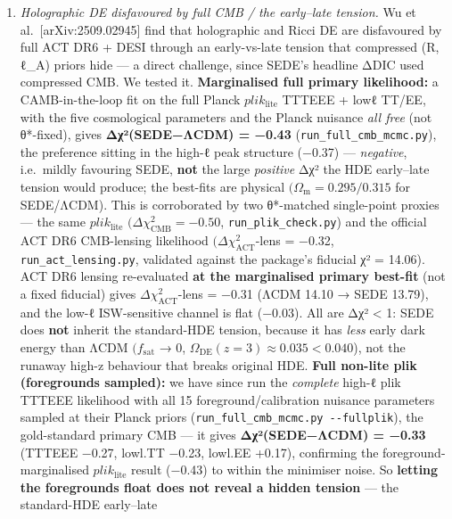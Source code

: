 \documentclass[
  10pt,
]{article}
\providecommand{\tightlist}{%
  \setlength{\itemsep}{0pt}\setlength{\parskip}{0pt}}
\begin{document}
\begin{enumerate}
\def\labelenumi{\arabic{enumi}.}
\tightlist
\item
  \emph{Holographic DE disfavoured by full CMB / the early--late
  tension.} Wu et al.~{[}arXiv:2509.02945{]} find that holographic and
  Ricci DE are disfavoured by full ACT DR6 + DESI through an
  early-vs-late tension that compressed (R, ℓ\_A) priors hide --- a
  direct challenge, since SEDE's headline ΔDIC used compressed CMB. We
  tested it. \textbf{Marginalised full primary likelihood:} a
  CAMB-in-the-loop fit on the full Planck \(plik_{\mathrm{lite}}\)
  TTTEEE + lowℓ TT/EE, with the five cosmological parameters and the
  Planck nuisance \emph{all free} (not θ*-fixed), gives
  \textbf{Δχ²(SEDE−ΛCDM) = −0.43} (\texttt{run\_full\_cmb\_mcmc.py}),
  the preference sitting in the high-ℓ peak structure (−0.37) ---
  \emph{negative}, i.e.~mildly favouring SEDE, \textbf{not} the large
  \emph{positive} Δχ² the HDE early--late tension would produce; the
  best-fits are physical \((\Omega _{\mathrm{m}} = 0.295/0.315\) for
  SEDE/ΛCDM). This is corroborated by two θ*-matched single-point
  proxies --- the same \(plik_{\mathrm{lite}}\)
  \((\Delta \chi ^{2}_{\mathrm{CMB}} = -0.50\),
  \texttt{run\_plik\_check.py}) and the official ACT DR6 CMB-lensing
  likelihood \((\Delta \chi ^{2}_{\mathrm{ACT}}\)-lens = −0.32,
  \texttt{run\_act\_lensing.py}, validated against the package's
  fiducial χ² = 14.06). ACT DR6 lensing re-evaluated \textbf{at the
  marginalised primary best-fit} (not a fixed fiducial) gives
  \(\Delta \chi ^{2}_{\mathrm{ACT}}\)-lens = −0.31 (ΛCDM 14.10 → SEDE
  13.79), and the low-ℓ ISW-sensitive channel is flat (−0.03). All are
  \textbar Δχ²\textbar{} \textless{} 1: SEDE does \textbf{not} inherit
  the standard-HDE tension, because it has \emph{less} early dark energy
  than ΛCDM \((f_{\mathrm{sat}}\) → 0,
  \(\Omega _{\mathrm{DE}}(z=3) \approx  0.035 < 0.040\)), not the
  runaway high-z behaviour that breaks original HDE. \textbf{Full
  non-lite plik (foregrounds sampled):} we have since run the
  \emph{complete} high-ℓ plik TTTEEE likelihood with all 15
  foreground/calibration nuisance parameters sampled at their Planck
  priors (\texttt{run\_full\_cmb\_mcmc.py\ -\/-fullplik}), the
  gold-standard primary CMB --- it gives \textbf{Δχ²(SEDE−ΛCDM) = −0.33}
  (TTTEEE −0.27, lowl.TT −0.23, lowl.EE +0.17), confirming the
  foreground-marginalised \(plik_{\mathrm{lite}}\) result (−0.43) to
  within the minimiser noise. So \textbf{letting the foregrounds float
  does not reveal a hidden tension} --- the standard-HDE early--late

\end{enumerate}
\end{document}
